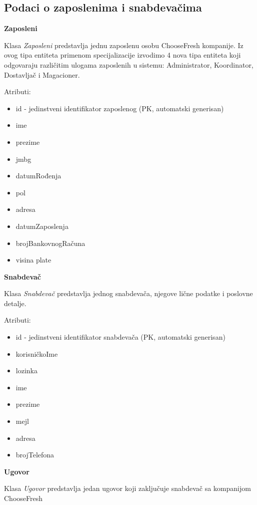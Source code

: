 \subsection{Podaci o zaposlenima i snabdevačima}

\textbf{\large Zaposleni}
\vspace{0.3cm}

Klasa \textit{Zaposleni} predstavlja jednu zaposlenu osobu ChooseFresh kompanije. Iz ovog tipa entiteta primenom specijalizacije izvodimo 4 nova tipa entiteta koji odgovaraju različitim ulogama zaposlenih u sistemu: Administrator, Koordinator, Dostavljač i Magacioner.

Atributi:
\begin{itemize}
    \item id - jedinstveni identifikator zaposlenog (PK, automatski generisan)
    \item ime
    \item prezime
    \item jmbg
    \item datumRođenja
    \item pol
    \item adresa
    \item datumZaposlenja
    \item brojBankovnogRačuna
    \item visina plate
\end{itemize}

\textbf{\large Snabdevač}
\vspace{0.3cm}

Klasa \textit{Snabdevač} predstavlja jednog snabdevača, njegove lične podatke i poslovne detalje.

Atributi:
\begin{itemize}
    \item id - jedinstveni identifikator snabdevača (PK, automatski generisan)
    \item korisničkoIme
    \item lozinka
    \item ime
    \item prezime
    \item mejl
    \item adresa
    \item brojTelefona
\end{itemize}

\textbf{\large Ugovor}
\vspace{0.3cm}

Klasa \textit{Ugovor} predstavlja jedan ugovor koji zaključuje snabdevač sa kompanijom ChooseFresh

